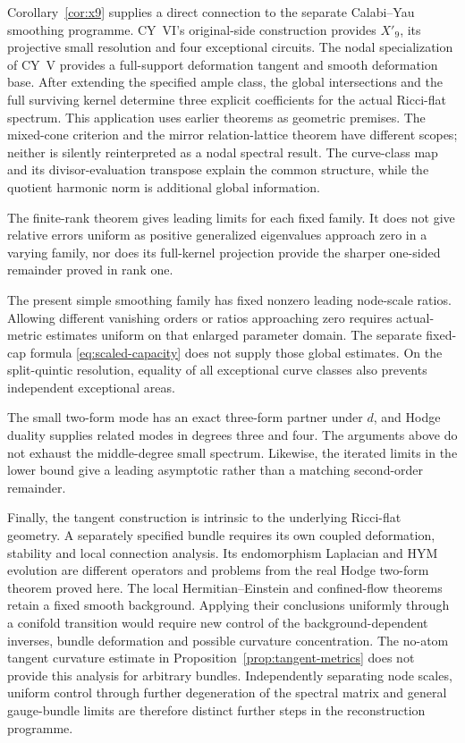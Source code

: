 Corollary~\ref{cor:x9} supplies a direct connection to the separate
Calabi--Yau smoothing programme. CY~VI's original-side construction
provides $X'_9$, its projective small resolution and four exceptional
circuits. The nodal specialization of CY~V provides a full-support
deformation tangent and smooth deformation base. After extending the
specified ample class, the global intersections and the full surviving
kernel determine three explicit coefficients for the actual Ricci-flat
spectrum. This application uses earlier theorems as geometric premises.
The mixed-cone criterion and the mirror relation-lattice theorem have
different scopes; neither is silently reinterpreted as a nodal spectral
result. The curve-class map and its divisor-evaluation transpose explain
the common structure, while the quotient harmonic norm is additional
global information.

The finite-rank theorem gives leading limits for each fixed family.
It does not give relative errors uniform as positive generalized
eigenvalues approach zero in a varying family, nor does its full-kernel
projection provide the sharper one-sided remainder proved in rank one.

The present simple smoothing family has fixed nonzero leading node-scale
ratios. Allowing different vanishing orders or ratios approaching zero
requires actual-metric estimates uniform on that enlarged parameter domain.
The separate fixed-cap formula \eqref{eq:scaled-capacity} does not supply
those global estimates. On the split-quintic resolution, equality of all
exceptional curve classes also prevents independent exceptional areas.

The small two-form mode has an exact three-form partner under $d$, and
Hodge duality supplies related modes in degrees three and four. The
arguments above do not exhaust the middle-degree small spectrum. Likewise,
the iterated limits in the lower bound give a leading asymptotic rather
than a matching second-order remainder.

Finally, the tangent construction is intrinsic to the underlying
Ricci-flat geometry. A separately specified bundle requires its own
coupled deformation, stability and local connection analysis. Its
endomorphism Laplacian and HYM evolution are different operators and
problems from the real Hodge two-form theorem proved here. The local
Hermitian--Einstein and confined-flow theorems
\cite{wuebben-local-he,wuebben-hym-phase} retain a fixed smooth
background. Applying their conclusions uniformly through a conifold
transition would require new control of the background-dependent
inverses, bundle deformation and possible curvature concentration.
The no-atom tangent curvature estimate in
Proposition~\ref{prop:tangent-metrics} does not provide this analysis for
arbitrary bundles. Independently separating node scales, uniform control
through further degeneration of the spectral matrix and general
gauge-bundle limits are therefore distinct further steps in the
reconstruction programme.
